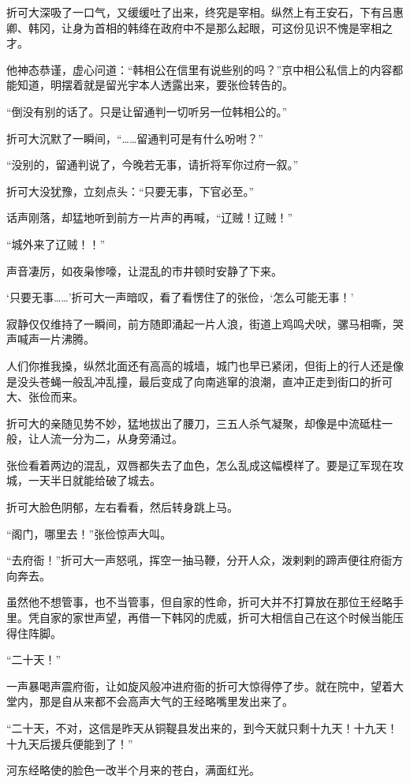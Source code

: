折可大深吸了一口气，又缓缓吐了出来，终究是宰相。纵然上有王安石，下有吕惠卿、韩冈，让身为首相的韩绛在政府中不是那么起眼，可这份见识不愧是宰相之才。

他神态恭谨，虚心问道：“韩相公在信里有说些别的吗？”京中相公私信上的内容都能知道，明摆着就是留光宇本人透露出来，要张俭转告的。

“倒没有别的话了。只是让留通判一切听另一位韩相公的。”

折可大沉默了一瞬间，“……留通判可是有什么吩咐？”

“没别的，留通判说了，今晚若无事，请折将军你过府一叙。”

折可大没犹豫，立刻点头：“只要无事，下官必至。”

话声刚落，却猛地听到前方一片声的再喊，“辽贼！辽贼！”

“城外来了辽贼！！”

声音凄厉，如夜枭惨嚎，让混乱的市井顿时安静了下来。

‘只要无事……’折可大一声暗叹，看了看愣住了的张俭，‘怎么可能无事！’

寂静仅仅维持了一瞬间，前方随即涌起一片人浪，街道上鸡鸣犬吠，骡马相嘶，哭声喊声一片沸腾。

人们你推我搡，纵然北面还有高高的城墙，城门也早已紧闭，但街上的行人还是像是没头苍蝇一般乱冲乱撞，最后变成了向南逃窜的浪潮，直冲正走到街口的折可大、张俭而来。

折可大的亲随见势不妙，猛地拔出了腰刀，三五人杀气凝聚，却像是中流砥柱一般，让人流一分为二，从身旁涌过。

张俭看着两边的混乱，双唇都失去了血色，怎么乱成这幅模样了。要是辽军现在攻城，一天半日就能给破了城去。

折可大脸色阴郁，左右看看，然后转身跳上马。

“阁门，哪里去！”张俭惊声大叫。

“去府衙！”折可大一声怒吼，挥空一抽马鞭，分开人众，泼剌剌的蹄声便往府衙方向奔去。

虽然他不想管事，也不当管事，但自家的性命，折可大并不打算放在那位王经略手里。凭自家的家世声望，再借一下韩冈的虎威，折可大相信自己在这个时候当能压得住阵脚。

“二十天！”

一声暴喝声震府衙，让如旋风般冲进府衙的折可大惊得停了步。就在院中，望着大堂内，那是自从来都不会高声大气的王经略嘴里发出来了。

“二十天，不对，这信是昨天从铜鞮县发出来的，到今天就只剩十九天！十九天！十九天后援兵便能到了！”

河东经略使的脸色一改半个月来的苍白，满面红光。

